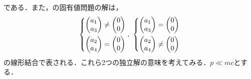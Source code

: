 \documentclass{report}
\begin{document}
    である．また，の固有値問題の解は，
    \begin{align}
      \begin{dcases}
        \mqty(a_1 \\ a_3) \neq \mqty(0 \\ 0) \\
        \mqty(a_2 \\ a_4) = \mqty(0 \\ 0)
      \end{dcases},\ 
      \begin{dcases}
        \mqty(a_1 \\ a_3) = \mqty(0 \\ 0) \\ 
        \mqty(a_2 \\ a_4) \neq \mqty(0 \\ 0)
      \end{dcases}
    \end{align}
    の線形結合で表される．これら2つの独立解の意味を考えてみる．$p \ll mc$とする．
\end{document}
